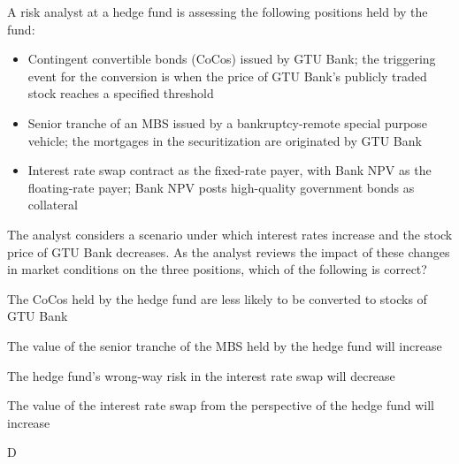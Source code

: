 \documentclass{article}
\newcounter{question} %
\begin{document}
\begin{question}
    A risk analyst at a hedge fund is assessing the following positions held by the fund:
    \begin{itemize}
        \item Contingent convertible bonds (CoCos) issued by GTU Bank; the triggering event for the conversion is when the price of GTU Bank's publicly traded stock reaches a specified threshold
        \item Senior tranche of an MBS issued by a bankruptcy-remote special purpose vehicle; the mortgages in the securitization are originated by GTU Bank
        \item Interest rate swap contract as the fixed-rate payer, with Bank NPV as the floating-rate payer; Bank NPV posts high-quality government bonds as collateral
    \end{itemize}
    The analyst considers a scenario under which interest rates increase and the stock price of GTU Bank decreases. As the analyst reviews the impact of these changes in market conditions on the three positions, which of the following is correct?
\end{question}

\begin{choices}
    \item The CoCos held by the hedge fund are less likely to be converted to stocks of GTU Bank
    \item The value of the senior tranche of the MBS held by the hedge fund will increase
    \item The hedge fund's wrong-way risk in the interest rate swap will decrease
    \item The value of the interest rate swap from the perspective of the hedge fund will increase
\end{choices}

\begin{correctanswer}
    D
\end{correctanswer}
\end{document}
